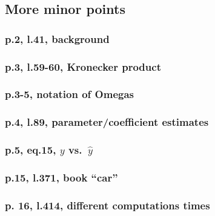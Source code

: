 \documentclass[12pt,english]{scrartcl}
\begin{document}
\subsection{More minor points}

\subsubsection{p.2, l.41, background}

\subsubsection{p.3, l.59-60, Kronecker product}

\subsubsection{p.3-5, notation of Omegas}

\subsubsection{p.4, l.89, parameter/coefficient estimates}

\subsubsection{p.5, eq.15, $y$ vs.\ $\hat{y}$}

\subsubsection{p.15, l.371, book ``car''}

\subsubsection{p. 16, l.414, different computations times}
\end{document}
